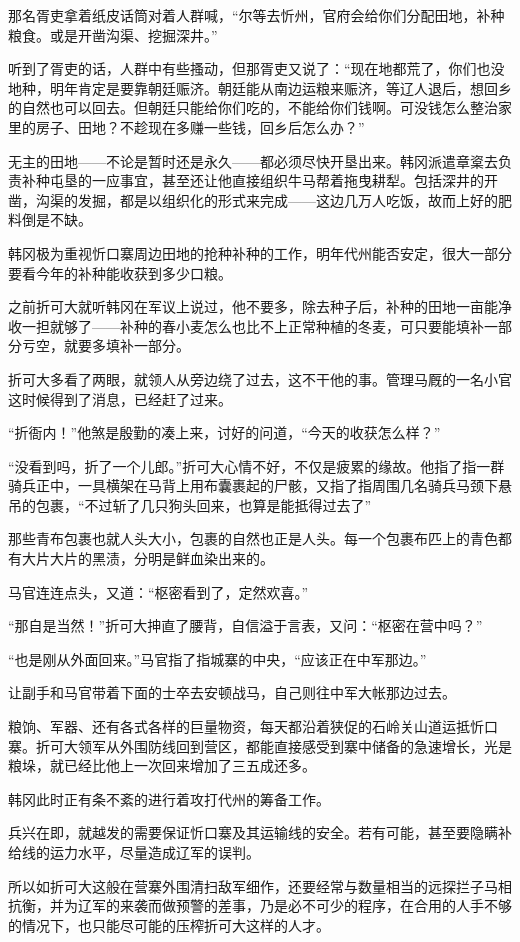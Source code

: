 那名胥吏拿着纸皮话筒对着人群喊，“尔等去忻州，官府会给你们分配田地，补种粮食。或是开凿沟渠、挖掘深井。”

听到了胥吏的话，人群中有些搔动，但那胥吏又说了：“现在地都荒了，你们也没地种，明年肯定是要靠朝廷赈济。朝廷能从南边运粮来赈济，等辽人退后，想回乡的自然也可以回去。但朝廷只能给你们吃的，不能给你们钱啊。可没钱怎么整治家里的房子、田地？不趁现在多赚一些钱，回乡后怎么办？”

无主的田地——不论是暂时还是永久——都必须尽快开垦出来。韩冈派遣章楶去负责补种屯垦的一应事宜，甚至还让他直接组织牛马帮着拖曳耕犁。包括深井的开凿，沟渠的发掘，都是以组织化的形式来完成——这边几万人吃饭，故而上好的肥料倒是不缺。

韩冈极为重视忻口寨周边田地的抢种补种的工作，明年代州能否安定，很大一部分要看今年的补种能收获到多少口粮。

之前折可大就听韩冈在军议上说过，他不要多，除去种子后，补种的田地一亩能净收一担就够了——补种的春小麦怎么也比不上正常种植的冬麦，可只要能填补一部分亏空，就要多填补一部分。

折可大多看了两眼，就领人从旁边绕了过去，这不干他的事。管理马厩的一名小官这时候得到了消息，已经赶了过来。

“折衙内！”他煞是殷勤的凑上来，讨好的问道，“今天的收获怎么样？”

“没看到吗，折了一个儿郎。”折可大心情不好，不仅是疲累的缘故。他指了指一群骑兵正中，一具横架在马背上用布囊裹起的尸骸，又指了指周围几名骑兵马颈下悬吊的包裹，“不过斩了几只狗头回来，也算是能抵得过去了”

那些青布包裹也就人头大小，包裹的自然也正是人头。每一个包裹布匹上的青色都有大片大片的黑渍，分明是鲜血染出来的。

马官连连点头，又道：“枢密看到了，定然欢喜。”

“那自是当然！”折可大抻直了腰背，自信溢于言表，又问：“枢密在营中吗？”

“也是刚从外面回来。”马官指了指城寨的中央，“应该正在中军那边。”

让副手和马官带着下面的士卒去安顿战马，自己则往中军大帐那边过去。

粮饷、军器、还有各式各样的巨量物资，每天都沿着狭促的石岭关山道运抵忻口寨。折可大领军从外围防线回到营区，都能直接感受到寨中储备的急速增长，光是粮垛，就已经比他上一次回来增加了三五成还多。

韩冈此时正有条不紊的进行着攻打代州的筹备工作。

兵兴在即，就越发的需要保证忻口寨及其运输线的安全。若有可能，甚至要隐瞒补给线的运力水平，尽量造成辽军的误判。

所以如折可大这般在营寨外围清扫敌军细作，还要经常与数量相当的远探拦子马相抗衡，并为辽军的来袭而做预警的差事，乃是必不可少的程序，在合用的人手不够的情况下，也只能尽可能的压榨折可大这样的人才。

